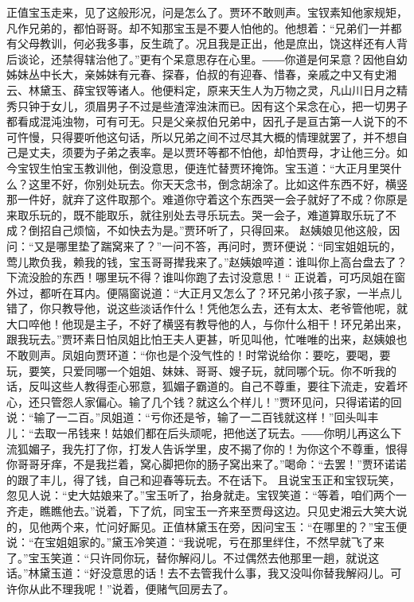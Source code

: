\documentclass[12pt,oneside]{book}
\begin{document}
正值宝玉走来，见了这般形况，问是怎么了。贾环不敢则声。宝钗素知他家规矩，凡作兄弟的，都怕哥哥。却不知那宝玉是不要人怕他的。他想着：“兄弟们一并都有父母教训，何必我多事，反生疏了。况且我是正出，他是庶出，饶这样还有人背后谈论，还禁得辖治他了。”更有个呆意思存在心里。――你道是何呆意？因他自幼姊妹丛中长大，亲姊妹有元春、探春，伯叔的有迎春、惜春，亲戚之中又有史湘云、林黛玉、薛宝钗等诸人。他便料定，原来天生人为万物之灵，凡山川日月之精秀只钟于女儿，须眉男子不过是些渣滓浊沫而已。因有这个呆念在心，把一切男子都看成混沌浊物，可有可无。只是父亲叔伯兄弟中，因孔子是亘古第一人说下的不可忤慢，只得要听他这句话，所以兄弟之间不过尽其大概的情理就罢了，并不想自己是丈夫，须要为子弟之表率。是以贾环等都不怕他，却怕贾母，才让他三分。如今宝钗生怕宝玉教训他，倒没意思，便连忙替贾环掩饰。宝玉道：“大正月里哭什么？这里不好，你别处玩去。你天天念书，倒念胡涂了。比如这件东西不好，横竖那一件好，就弃了这件取那个。难道你守着这个东西哭一会子就好了不成？你原是来取乐玩的，既不能取乐，就往别处去寻乐玩去。哭一会子，难道算取乐玩了不成？倒招自己烦恼，不如快去为是。”贾环听了，只得回来。
赵姨娘见他这般，因问：“又是哪里垫了踹窝来了？”一问不答，再问时，贾环便说：“同宝姐姐玩的，莺儿欺负我，赖我的钱，宝玉哥哥撵我来了。”赵姨娘啐道：谁叫你上高台盘去了？下流没脸的东西！哪里玩不得？谁叫你跑了去讨没意思！“
正说着，可巧凤姐在窗外过，都听在耳内。便隔窗说道：“大正月又怎么了？环兄弟小孩子家，一半点儿错了，你只教导他，说这些淡话作什么！凭他怎么去，还有太太、老爷管他呢，就大口啐他！他现是主子，不好了横竖有教导他的人，与你什么相干！环兄弟出来，跟我玩去。”贾环素日怕凤姐比怕王夫人更甚，听见叫他，忙唯唯的出来，赵姨娘也不敢则声。凤姐向贾环道：“你也是个没气性的！时常说给你：要吃，要喝，要玩，要笑，只爱同哪一个姐姐、妹妹、哥哥、嫂子玩，就同哪个玩。你不听我的话，反叫这些人教得歪心邪意，狐媚子霸道的。自己不尊重，要往下流走，安着坏心，还只管怨人家偏心。输了几个钱？就这么个样儿！”贾环见问，只得诺诺的回说：“输了一二百。”凤姐道：“亏你还是爷，输了一二百钱就这样！”回头叫丰儿：“去取一吊钱来！姑娘们都在后头顽呢，把他送了玩去。――你明儿再这么下流狐媚子，我先打了你，打发人告诉学里，皮不揭了你的！为你这个不尊重，恨得你哥哥牙痒，不是我拦着，窝心脚把你的肠子窝出来了。”喝命：“去罢！”贾环诺诺的跟了丰儿，得了钱，自己和迎春等玩去。不在话下。
且说宝玉正和宝钗玩笑，忽见人说：“史大姑娘来了。”宝玉听了，抬身就走。宝钗笑道：“等着，咱们两个一齐走，瞧瞧他去。”说着，下了炕，同宝玉一齐来至贾母这边。只见史湘云大笑大说的，见他两个来，忙问好厮见。正值林黛玉在旁，因问宝玉：“在哪里的？”宝玉便说：“在宝姐姐家的。”黛玉冷笑道：“我说呢，亏在那里绊住，不然早就飞了来了。”宝玉笑道：“只许同你玩，替你解闷儿。不过偶然去他那里一趟，就说这话。”林黛玉道：“好没意思的话！去不去管我什么事，我又没叫你替我解闷儿。可许你从此不理我呢！”说着，便赌气回房去了。
\end{document}
